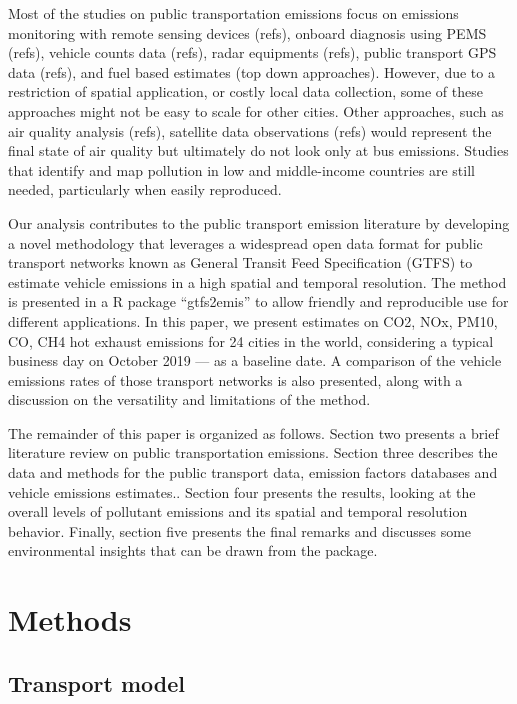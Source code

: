 \documentclass[gc, manuscript]{copernicus}
\begin{document}
Most of the studies on public transportation emissions focus on
emissions monitoring with remote sensing devices (refs), onboard
diagnosis using PEMS (refs), vehicle counts data (refs), radar
equipments (refs), public transport GPS data (refs), and fuel based
estimates (top down approaches). However, due to a restriction of
spatial application, or costly local data collection, some of these
approaches might not be easy to scale for other cities. Other
approaches, such as air quality analysis (refs), satellite data
observations (refs) would represent the final state of air quality but
ultimately do not look only at bus emissions. Studies that identify and
map pollution in low and middle-income countries are still needed,
particularly when easily reproduced.

Our analysis contributes to the public transport emission literature by
developing a novel methodology that leverages a widespread open data
format for public transport networks known as General Transit Feed
Specification (GTFS) to estimate vehicle emissions in a high spatial and
temporal resolution. The method is presented in a R package
``gtfs2emis'' to allow friendly and reproducible use for different
applications. In this paper, we present estimates on CO2, NOx, PM10, CO,
CH4 hot exhaust emissions for 24 cities in the world, considering a
typical business day on October 2019 --- as a baseline date. A
comparison of the vehicle emissions rates of those transport networks is
also presented, along with a discussion on the versatility and
limitations of the method.

The remainder of this paper is organized as follows. Section two
presents a brief literature review on public transportation emissions.
Section three describes the data and methods for the public transport
data, emission factors databases and vehicle emissions estimates..
Section four presents the results, looking at the overall levels of
pollutant emissions and its spatial and temporal resolution behavior.
Finally, section five presents the final remarks and discusses some
environmental insights that can be drawn from the package.

\section{Methods}

\subsection{Transport model}
\end{document}
